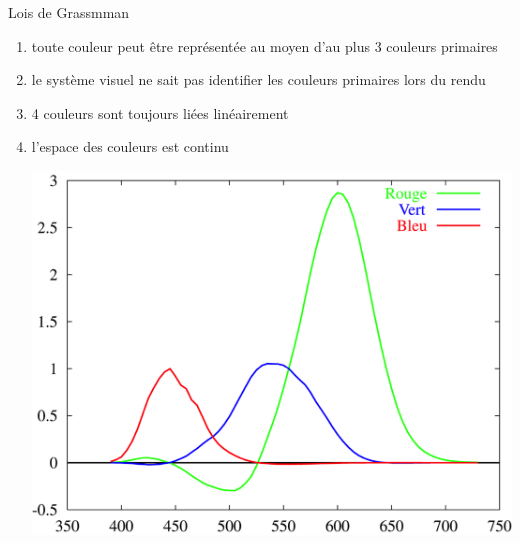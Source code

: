 \begin{frame}{Lois de Grassmman}
\begin{enumerate}
\item toute couleur peut être représentée au moyen d'au plus 3 couleurs primaires

\item le système visuel ne sait pas identifier les couleurs primaires lors du rendu

\item 4 couleurs sont toujours liées linéairement

\item l'espace des couleurs est continu

\begin{center}
\includegraphics[height=.4\textheight]{figs/rgbsp.png}
\end{center}
\end{enumerate}
\end{frame}

